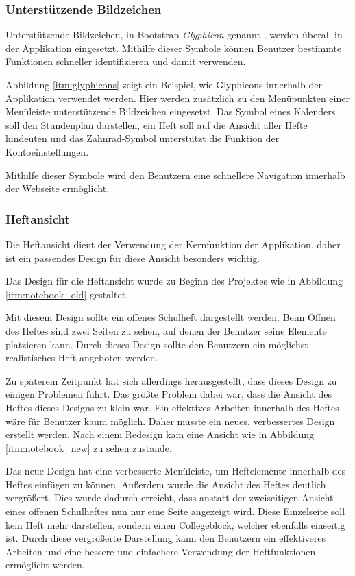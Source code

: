 \subsubsection{Unterstützende Bildzeichen}
Unterstützende Bildzeichen, in Bootstrap \textit{Glyphicon} genannt \cite{GLYPHICON}, werden überall in der Applikation eingesetzt. Mithilfe dieser Symbole können Benutzer bestimmte Funktionen schneller identifizieren und damit verwenden.


Abbildung \ref{itm:glyphicons} zeigt ein Beispiel, wie Glyphicons innerhalb der Applikation verwendet werden. Hier werden zusätzlich zu den Menüpunkten einer Menüleiste unterstützende Bildzeichen eingesetzt. Das Symbol eines Kalenders soll den Stundenplan darstellen, ein Heft soll auf die Ansicht aller Hefte hindeuten und das Zahnrad-Symbol unterstützt die Funktion der Kontoeinstellungen.

Mithilfe dieser Symbole wird den Benutzern eine schnellere Navigation innerhalb der Webseite ermöglicht.

\subsubsection{Heftansicht}
Die Heftansicht dient der Verwendung der Kernfunktion der Applikation, daher ist ein passendes Design für diese Ansicht besonders wichtig.

Das Design für die Heftansicht wurde zu Beginn des Projektes wie in Abbildung \ref{itm:notebook_old} gestaltet.


Mit diesem Design sollte ein offenes Schulheft dargestellt werden. Beim Öffnen des Heftes sind zwei Seiten zu sehen, auf denen der Benutzer seine Elemente platzieren kann. Durch dieses Design sollte den Benutzern ein möglichst realistisches Heft angeboten werden.

Zu späterem Zeitpunkt hat sich allerdings herausgestellt, dass dieses Design zu einigen Problemen führt. Das größte Problem dabei war, dass die Ansicht des Heftes dieses Designs zu klein war. Ein effektives Arbeiten innerhalb des Heftes wäre für Benutzer kaum möglich. Daher musste ein neues, verbessertes Design erstellt werden. Nach einem Redesign kam eine Ansicht wie in Abbildung \ref{itm:notebook_new} zu sehen zustande.


Das neue Design hat eine verbesserte Menüleiste, um Heftelemente innerhalb des Heftes einfügen zu können. Außerdem wurde die Ansicht des Heftes deutlich vergrößert. Dies wurde dadurch erreicht, dass anstatt der zweiseitigen Ansicht eines offenen Schulheftes nun nur eine Seite angezeigt wird. Diese Einzelseite soll kein Heft mehr darstellen, sondern einen Collegeblock, welcher ebenfalls einseitig ist. Durch diese vergrößerte Darstellung kann den Benutzern ein effektiveres Arbeiten und eine bessere und einfachere Verwendung der Heftfunktionen ermöglicht werden.
